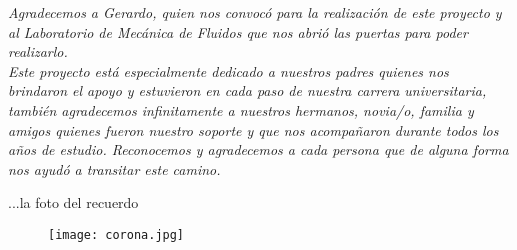 	
	\vspace{6cm}

 
		\begin{flushright}
	\textit{	Agradecemos a Gerardo, quien nos convocó para la realización de este proyecto y al Laboratorio de Mecánica de Fluidos que nos abrió las puertas para poder realizarlo.}\\
		\vspace{3cm}
	\textit{	Este proyecto está especialmente dedicado a nuestros padres quienes nos brindaron el apoyo y estuvieron en cada paso de nuestra carrera universitaria, también agradecemos infinitamente a nuestros hermanos, novia/o, familia y amigos quienes fueron nuestro soporte y que nos acompañaron durante todos los años de estudio. Reconocemos y agradecemos a cada persona que de alguna forma nos ayudó a transitar este camino.}
		\end{flushright}

	
	
		

\newpage
\vspace*{6cm}
\begin{flushright}
	...la foto del recuerdo
\end{flushright}
	
\begin{figure}[htb]
	\centering
	\texttt{[image: corona.jpg]}
	\label{fig:corona}
\end{figure}


\newpage
